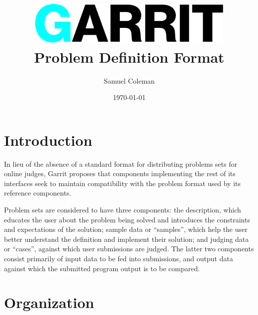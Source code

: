 \documentclass[11pt,letterpaper]{article}
\begin{document}
\title{\includegraphics[width=0.75\textwidth]{logo.eps}\\
Problem Definition Format}
\author{Samuel Coleman}
\date{\today}

\hypersetup{pageanchor=false}
\begin{titlepage}

\maketitle
\thispagestyle{empty}

\end{titlepage}
\hypersetup{pageanchor=true}

\tableofcontents

\newpage

\section{Introduction}
\label{introduction}

In lieu of the absence of a standard format for distributing problems sets for
online judges, Garrit proposes that components implementing the rest of its
interfaces seek to maintain compatibility with the problem format used by its
reference components.

Problem sets are considered to have three components: the description, which
educates the user about the problem being solved and introduces the constraints
and expectations of the solution; sample data or ``samples'', which help the
user better understand the definition and implement their solution; and judging
data or ``cases'', against which user submissions are judged. The latter two
components consist primarily of input data to be fed into submissions, and
output data against which the submitted program output is to be compared.

\section{Organization}
\label{organization}
\end{document}
